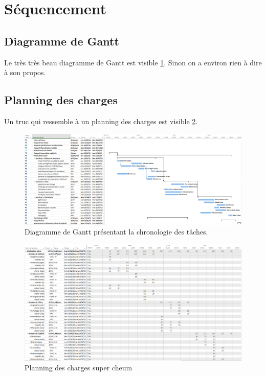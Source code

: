 \section{Séquencement}
	\label{sec:sequencement}

	\subsection{Diagramme de Gantt}
		Le très très beau diagramme de Gantt est visible \ffigure{} \ref{fig:gantt}. Sinon on a environ rien à dire à son propos.

	\subsection{Planning des charges}
		Un truc qui ressemble à un planning des charges est visible \ffigure{} \ref{fig:planning_charge}.

		\begin{landscape}
		 	\begin{figure}
	            \centering
	            \includegraphics[height=0.70\textwidth]{figure/DiagGantt.png}
	            \caption{Diagramme de Gantt présentant la chronologie des tâches.}
	            \label{fig:gantt}
	        \end{figure}
	    \end{landscape}

		\begin{landscape}
		 	\begin{figure}
	            \centering
	            \includegraphics[height=0.70\textwidth]{figure/RepartitionTaches2.png}
	            \caption{Planning des charges super cheum}
	            \label{fig:planning_charge}
	        \end{figure}
	    \end{landscape}